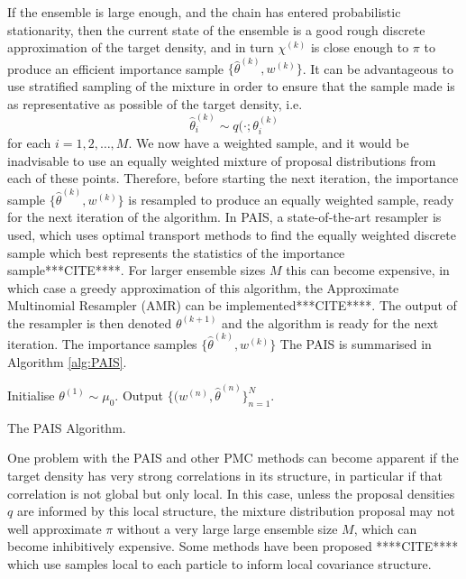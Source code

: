 \documentclass[final]{siamltex}
\begin{document}
If the ensemble is large enough, and the chain has entered
probabilistic stationarity, then the current state of the ensemble is
a good rough discrete approximation of the target density, and in turn
$\chi^{(k)}$ is close enough to $\pi$ to produce an efficient importance
sample $\{\hat{\theta}^{(k)},w^{(k)}\}$. It can be advantageous to use stratified sampling of the
mixture in order to
ensure that the sample made is as representative as possible of the
target density, i.e.
\[ \hat{\theta}_i^{(k)} \sim q(\cdot ; \theta_i^{(k)}\]
for each $i = 1,2,\ldots,M$. We now have a weighted sample, and it
would be inadvisable to use an equally weighted mixture of proposal
distributions from each of these points. Therefore, before starting
the next iteration, the importance sample
$\{\hat{\theta}^{(k)},w^{(k)}\}$ is resampled to produce an equally
weighted sample, ready for the next iteration of the algorithm. In
PAIS, a state-of-the-art resampler is used, which uses optimal
transport methods to find the equally weighted discrete sample which
best represents the statistics of the importance
sample***CITE****. For larger ensemble sizes $M$ this can become
expensive, in which case a greedy approximation of this algorithm, the
Approximate Multinomial Resampler (AMR) can be
implemented***CITE****. The output of the resampler is then denoted
$\theta^{(k+1)}$ and the algorithm is ready for the next
iteration. The importance samples $\{\hat{\theta}^{(k)},w^{(k)}\}$ The PAIS is summarised in Algorithm \ref{alg:PAIS}.

\begin{table}[!h]
\centering
\begin{algorithm}[H]
\DontPrintSemicolon
\BlankLine
	Initialise $\theta^{(1)} \sim \mu_0$.\;
	Output $\{(w^{(n)}, \hat{\theta}^{(n)}\}_{n=1}^N$.
\caption{The PAIS Algorithm.\label{alg:PAIS}}
\end{algorithm}
\end{table}

One problem with the PAIS and other PMC methods can become apparent if
the target density has very strong correlations in its structure, in
particular if that correlation is not global but only local. In this
case, unless the proposal densities $q$ are informed by this local
structure, the mixture distribution proposal may not well approximate
$\pi$ without a very large large ensemble size $M$, which can become
inhibitively expensive. Some methods have been proposed ****CITE****
which use samples local to each particle to inform local covariance
structure.
\end{document}
